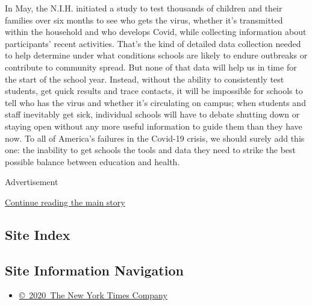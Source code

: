 In May, the N.I.H. initiated a study to test thousands of children and
their families over six months to see who gets the virus, whether it's
transmitted within the household and who develops Covid, while
collecting information about participants' recent activities. That's the
kind of detailed data collection needed to help determine under what
conditions schools are likely to endure outbreaks or contribute to
community spread. But none of that data will help us in time for the
start of the school year. Instead, without the ability to consistently
test students, get quick results and trace contacts, it will be
impossible for schools to tell who has the virus and whether it's
circulating on campus; when students and staff inevitably get sick,
individual schools will have to debate shutting down or staying open
without any more useful information to guide them than they have now. To
all of America's failures in the Covid-19 crisis, we should surely add
this one: the inability to get schools the tools and data they need to
strike the best possible balance between education and health.

Advertisement

\protect\hyperlink{after-bottom}{Continue reading the main story}

\hypertarget{site-index}{%
\subsection{Site Index}\label{site-index}}

\hypertarget{site-information-navigation}{%
\subsection{Site Information
Navigation}\label{site-information-navigation}}

\begin{itemize}
\tightlist
\item
  \href{https://help.nytimes3xbfgragh.onion/hc/en-us/articles/115014792127-Copyright-notice}{©~2020~The
  New York Times Company}
\end{itemize}

